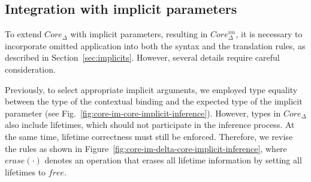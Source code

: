\documentclass[acmsmall,review,screen]{acmart}
\begin{document}





\subsection{Integration with implicit parameters}

To extend $Core_\Delta$ with implicit parameters, resulting in $Core_\Delta^{im}$, it is necessary to incorporate omitted application into both the syntax and the translation rules, as described in Section~\ref{sec:implicits}.
However, several details require careful consideration.

Previously, to select appropriate implicit arguments, we employed type equality between the type of the contextual binding and the expected type of the implicit parameter (see Fig.\ \ref{fig:core-im-core-implicit-inference}).
However, types in $Core_\Delta$ also include lifetimes, which should not participate in the inference process.
At the same time, lifetime correctness must still be enforced.
Therefore, we revise the rules as shown in Figure~\ref{fig:core-im-delta-core-implicit-inference}, where $erase(\cdot)$ denotes an operation that erases all lifetime information by setting all lifetimes to $free$.
\end{document}

